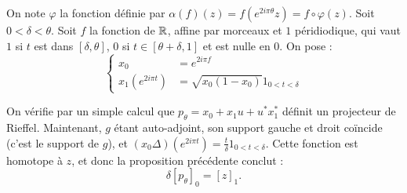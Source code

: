 On note $\varphi$ la fonction définie par $\alpha (f) (z) = f(e^{2i\pi\theta}z)=f\circ \varphi (z)$.
Soit $0<\delta<\theta$. Soit $f$ la fonction de $\mathbb R$, affine par morceaux et $1$ péridiodique, qui vaut $1$ si $t$ est dans $[\delta, \theta]$, $0$ si $t\in [\theta+\delta,1]$ et est nulle en $0$. On pose : 
\[\left\{ \begin{array}{rl}x_0& =e^{2i\pi f }\\
				x_1 (e^{2i\pi t})&= \sqrt{x_0(1-x_0)} 1_{0<t<\delta}
\end{array}\right.\]  

On vérifie par un simple calcul que $p_\theta=x_0+x_1 u +u^*x_1^*$ définit un projecteur de Rieffel. Maintenant, $g$ étant auto-adjoint, son support gauche et droit coïncide (c'est le support de $g$), et $(x_0\Delta)(e^{2i\pi t}) = \frac{t}{\delta}1_{0<t<\delta}$. Cette fonction est homotope à $z$, et donc la proposition précédente conclut : 
\[\delta [p_\theta]_0= [z]_1.\]
